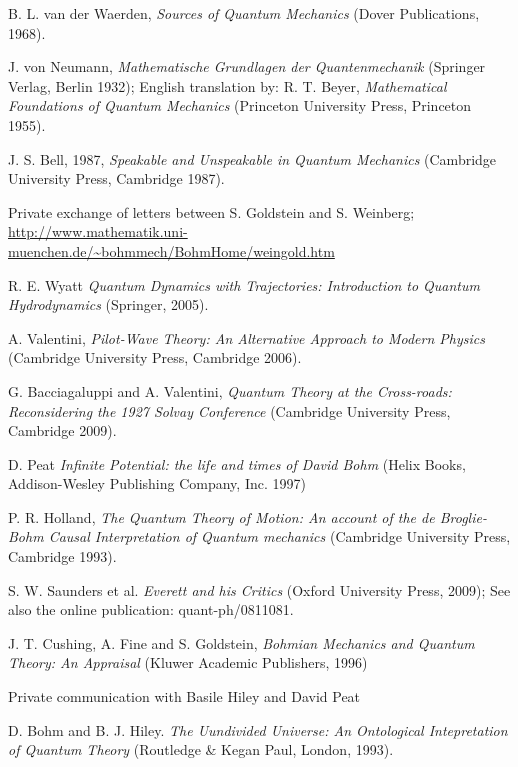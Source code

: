 \documentclass[onecolumn,nofootinbib, secnumarabic, amsmath, nobibnotes,12pt,aps,pra]{revtex4-1}
\begin{document}
\begin{thebibliography}{999}
B. L. van der Waerden, \emph{Sources of Quantum Mechanics} (Dover Publications, 1968).

J. von Neumann, \emph{Mathematische Grundlagen der Quantenmechanik} (Springer Verlag, Berlin 1932); English translation by: R. T. Beyer, \emph{Mathematical Foundations of Quantum Mechanics} (Princeton University Press, Princeton 1955).

J. S. Bell, 1987, \emph{Speakable and Unspeakable in Quantum Mechanics} (Cambridge University Press, Cambridge 1987).

Private exchange of letters between S. Goldstein and S. Weinberg; \url{http://www.mathematik.uni-muenchen.de/~bohmmech/BohmHome/weingold.htm}

R. E. Wyatt \emph{Quantum Dynamics with Trajectories: Introduction to Quantum Hydrodynamics} (Springer, 2005).

A. Valentini, \emph{Pilot-Wave Theory: An Alternative Approach to Modern Physics} (Cambridge University Press, Cambridge 2006).

G. Bacciagaluppi and A. Valentini, \emph{Quantum Theory at the Cross-roads: Reconsidering the 1927 Solvay Conference} (Cambridge University Press, Cambridge 2009).

D. Peat \emph{Infinite Potential: the life and times of David Bohm} (Helix Books, Addison-Wesley Publishing Company, Inc. 1997)

P. R. Holland, \emph{The Quantum Theory of Motion: An account of the de Broglie-Bohm Causal Interpretation of Quantum mechanics}  (Cambridge University Press, Cambridge 1993).

S. W. Saunders et al. \emph{Everett and his Critics} (Oxford University Press, 2009); See also the online publication: quant-ph/0811081.

J. T. Cushing, A. Fine and S. Goldstein, \emph{Bohmian Mechanics and Quantum Theory: An Appraisal}  (Kluwer Academic Publishers, 1996)

Private communication with Basile Hiley and David Peat

D. Bohm and B. J. Hiley. \emph{The Uundivided Universe: An Ontological Intepretation of Quantum Theory} (Routledge \& Kegan Paul, London, 1993).


\end{thebibliography}
\end{document}
